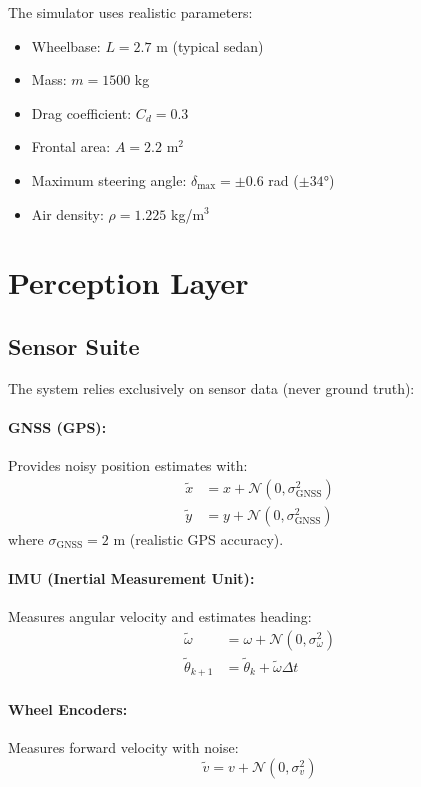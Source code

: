\documentclass[11pt,a4paper]{article}
\begin{document}
The simulator uses realistic parameters:
\begin{itemize}
    \item Wheelbase: $L = 2.7$ m (typical sedan)
    \item Mass: $m = 1500$ kg
    \item Drag coefficient: $C_d = 0.3$
    \item Frontal area: $A = 2.2$ m$^2$
    \item Maximum steering angle: $\delta_{\max} = \pm 0.6$ rad ($\pm 34°$)
    \item Air density: $\rho = 1.225$ kg/m$^3$
\end{itemize}

\section{Perception Layer}

\subsection{Sensor Suite}

The system relies exclusively on sensor data (never ground truth):

\paragraph{GNSS (GPS):}
Provides noisy position estimates with:
\begin{align}
\tilde{x} &= x + \mathcal{N}(0, \sigma_{\text{GNSS}}^2) \\
\tilde{y} &= y + \mathcal{N}(0, \sigma_{\text{GNSS}}^2)
\end{align}
where $\sigma_{\text{GNSS}} = 2$ m (realistic GPS accuracy).

\paragraph{IMU (Inertial Measurement Unit):}
Measures angular velocity and estimates heading:
\begin{align}
\tilde{\omega} &= \omega + \mathcal{N}(0, \sigma_{\omega}^2) \\
\tilde{\theta}_{k+1} &= \tilde{\theta}_k + \tilde{\omega} \Delta t
\end{align}

\paragraph{Wheel Encoders:}
Measures forward velocity with noise:
\begin{equation}
\tilde{v} = v + \mathcal{N}(0, \sigma_v^2)
\end{equation}
\end{document}
